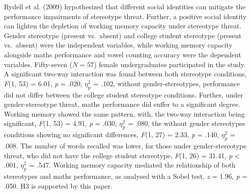 \documentclass[
  stu, a4paper, 12pt,mask,floatsintext]{apa7}
\begin{document}
Rydell et al. (2009) hypothesized that different social identities can mitigate the performance impairments of stereotype threat.
Further, a positive social identity can lighten the depletion of working memory capacity under stereotype threat.\\
Gender stereotype (present vs.~absent) and college student stereotype (present vs.~absent) were the independent variables, while working memory capacity alongside maths performance and vowel counting accuracy were the dependent variables.
Fifty-seven (\(N = 57\)) female undergraduates participated in the study.
A significant two-way interaction was found between both stereotype conditions, \emph{F}(1, 53) = 6.01, \emph{p} = .020, \(\eta^{2}_{\text{p}}\) = .102, without gender-stereotypes, performance did not differ between the college student stereotype conditions.
Further, under gender-stereotype threat, maths performance did suffer to a significant degree.
Working memory showed the same pattern, with, the two-way interaction being significant, \emph{F}(1, 53) = 4.91, \emph{p} = .030, \(\eta^{2}_{\text{p}}\) = .080, the without gender stereotypes conditions showing no significant differences, \emph{F}(1, 27) = 2.33, \emph{p} = .140, \(\eta^{2}_{\text{p}}\) = .008.
The number of words recalled was lower, for those under gender-stereotype threat, who did not have the college student stereotype, \emph{F}(1, 26) = 31.41, \emph{p} \textless{} .001, \(\eta^{2}_{\text{p}}\) = .547.
Working memory capacity mediated the relationship of both stereotypes and maths performance, as analysed with a Sobel test, \emph{z} = 1.96, \emph{p} = .050.
H3 is supported by this paper.
\end{document}
